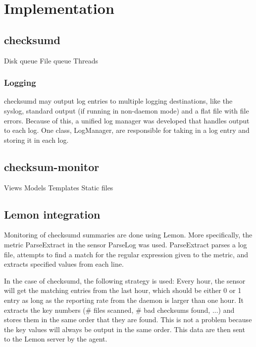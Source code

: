 \section{Implementation}
\subsection{checksumd}
Disk queue
File queue
Threads

\subsubsection{Logging}
checksumd may output log entries to multiple logging destinations, like the syslog, standard output (if running in non-daemon mode) and a flat file with file errors. Because of this, a unified log manager was developed that handles output to each log. One class, LogManager, are responsible for taking in a log entry and storing it in each log.  

\subsection{checksum-monitor}
Views
Models
Templates
Static files

\subsection{Lemon integration}
\label{sec:lemon_integration}
Monitoring of checksumd summaries are done using Lemon. More specifically, the metric ParseExtract in the sensor ParseLog was used. ParseExtract parses a log file, attempts to find a match for the regular expression given to the metric, and extracts specified values from each line. 

In the case of checksumd, the following strategy is used: Every hour, the sensor will get the matching entries from the last hour, which should be either 0 or 1 entry as long as the reporting rate from the daemon is larger than one hour. It extracts the key numbers (\# files scanned, \# bad checksums found, ...) and stores them in the same order that they are found. This is not a problem because the key values will always be output in the same order. This data are then sent to the Lemon server by the agent.
